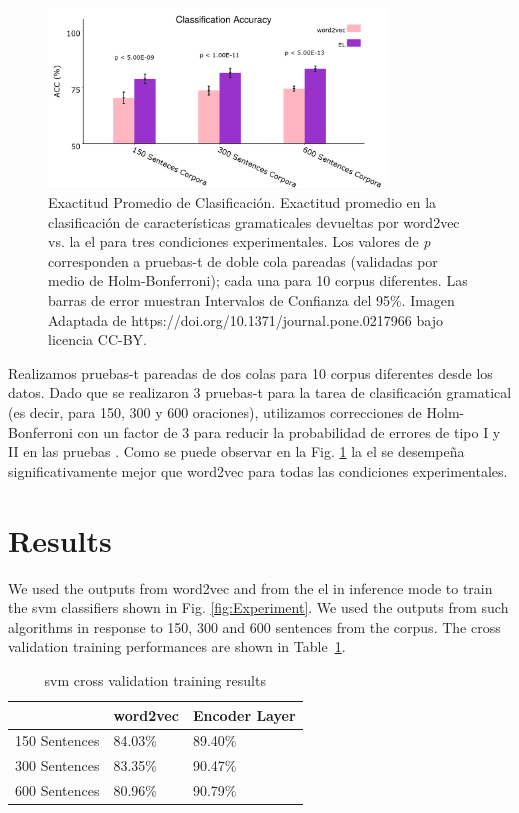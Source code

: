 {\begin{figure}[ht!]
    \centering
    \includegraphics[width=0.8\textwidth]{Grammar_PLOT.png}
    \caption{Exactitud Promedio de Clasificación. Exactitud promedio en la clasificación de características gramaticales devueltas por word2vec vs. la \gls{el} para tres condiciones experimentales. Los valores de \emph{p} corresponden a pruebas-t de doble cola pareadas (validadas por medio de Holm-Bonferroni); cada una para 10 corpus diferentes. Las barras de error muestran Intervalos de Confianza del 95\%. Imagen Adaptada de https://doi.org/10.1371/journal.pone.0217966 bajo licencia CC-BY.}
    \label{fig:Grammar_PLOT}
\end{figure}
  
Realizamos pruebas-t pareadas de dos colas para 10 corpus diferentes desde los datos.
Dado que se realizaron 3 pruebas-t para la tarea de clasificación gramatical (es decir, para 150, 300 y 600 oraciones), utilizamos correcciones de Holm-Bonferroni con un factor de 3 para reducir la probabilidad de errores de tipo I y II en las pruebas \cite{10.1093/biomet/75.2.383}.
Como se puede observar en la Fig. \ref{fig:Grammar_PLOT} la \gls{el} se desempeña significativamente mejor que word2vec para todas las condiciones experimentales.
}{
\section{Results}

We used the outputs from word2vec and from the \gls{el} in inference mode to train the \gls{svm} classifiers shown in Fig. \ref{fig:Experiment}. We used the outputs from such algorithms in response to 150, 300 and 600 sentences from the corpus. The cross validation training performances are shown in Table~\ref{SVM_Training}.

\begin{table}[ht!]
\centering
\caption{\gls{svm} cross validation training results}
\begin{tabular}{|l|l|l|}
\hline
                & word2vec  & Encoder Layer \\ \hline
150 Sentences   & 84.03\%   & 89.40\%       \\ \hline
300 Sentences   & 83.35\%   & 90.47\%       \\ \hline
600 Sentences   & 80.96\%   & 90.79\%       \\ \hline
\end{tabular}
\label{SVM_Training}
\end{table}

}
